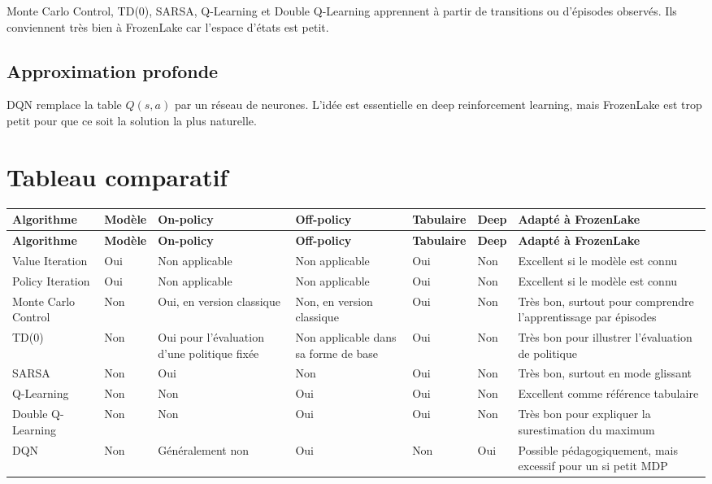 \documentclass[11pt,a4paper]{article}
\begin{document}
Monte Carlo Control, TD(0), SARSA, Q-Learning et Double Q-Learning apprennent à partir de transitions ou d'épisodes observés. Ils conviennent très bien à FrozenLake car l'espace d'états est petit.

\subsection{Approximation profonde}

DQN remplace la table $Q(s,a)$ par un réseau de neurones. L'idée est essentielle en deep reinforcement learning, mais FrozenLake est trop petit pour que ce soit la solution la plus naturelle.

\section{Tableau comparatif}

\renewcommand{\arraystretch}{1.3}
\small
\begin{longtable}{>{\raggedright\arraybackslash}p{2.8cm}
                  >{\centering\arraybackslash}p{1.6cm}
                  >{\centering\arraybackslash}p{1.8cm}
                  >{\centering\arraybackslash}p{1.8cm}
                  >{\centering\arraybackslash}p{1.6cm}
                  >{\centering\arraybackslash}p{1.2cm}
                  >{\centering\arraybackslash}p{2.4cm}}
\rowcolor{lightaccent}
\textbf{Algorithme} & \textbf{Modèle} & \textbf{On-policy} & \textbf{Off-policy} & \textbf{Tabulaire} & \textbf{Deep} & \textbf{Adapté à FrozenLake} \\
\midrule
\endfirsthead

\rowcolor{lightaccent}
\textbf{Algorithme} & \textbf{Modèle} & \textbf{On-policy} & \textbf{Off-policy} & \textbf{Tabulaire} & \textbf{Deep} & \textbf{Adapté à FrozenLake} \\
\midrule
\endhead

Value Iteration & Oui & Non applicable & Non applicable & Oui & Non & Excellent si le modèle est connu \\
Policy Iteration & Oui & Non applicable & Non applicable & Oui & Non & Excellent si le modèle est connu \\
Monte Carlo Control & Non & Oui, en version classique & Non, en version classique & Oui & Non & Très bon, surtout pour comprendre l'apprentissage par épisodes \\
TD(0) & Non & Oui pour l'évaluation d'une politique fixée & Non applicable dans sa forme de base & Oui & Non & Très bon pour illustrer l'évaluation de politique \\
SARSA & Non & Oui & Non & Oui & Non & Très bon, surtout en mode glissant \\
Q-Learning & Non & Non & Oui & Oui & Non & Excellent comme référence tabulaire \\
Double Q-Learning & Non & Non & Oui & Oui & Non & Très bon pour expliquer la surestimation du maximum \\
DQN & Non & Généralement non & Oui & Non & Oui & Possible pédagogiquement, mais excessif pour un si petit MDP \\
\bottomrule
\end{longtable}
\normalsize
\end{document}
